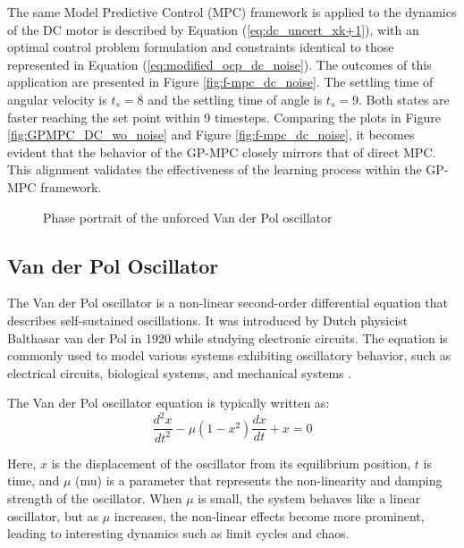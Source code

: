 The same Model Predictive Control (MPC) framework is applied to the dynamics of the DC motor is described by Equation (\ref{eq:dc_uncert_xk+1}), with an optimal control problem formulation and constraints identical to those represented in Equation (\ref{eq:modified_ocp_dc_noise}). The outcomes of this application are presented in Figure \ref{fig:f-mpc_dc_noise}. The settling time of angular velocity is $t_s=8$ and the settling time of angle is $t_s=9$. Both states are faster reaching the set point within 9 timesteps. Comparing the plots in Figure \ref{fig:GPMPC_DC_wo_noise} and Figure \ref{fig:f-mpc_dc_noise}, it becomes evident that the behavior of the GP-MPC closely mirrors that of direct MPC. This alignment validates the effectiveness of the learning process within the GP-MPC framework.

\begin{figure}
    \centering
    
    \caption{Phase portrait of the unforced Van der Pol oscillator}
    \label{fig:pp_vdp}
\end{figure}


\subsection{Van der Pol Oscillator}\label{sec:vdp_oscillator}
The Van der Pol oscillator is a non-linear second-order differential equation that describes self-sustained oscillations. It was introduced by Dutch physicist Balthasar van der Pol in 1920 while studying electronic circuits. The equation is commonly used to model various systems exhibiting oscillatory behavior, such as electrical circuits, biological systems, and mechanical systems \cite{guckenheimer1980}.



The Van der Pol oscillator equation is typically written as:
\begin{equation} \label{eq:vdp_deq}
    \frac{{d^2x}}{{dt^2}} - \mu (1 - x^2) \frac{{dx}}{{dt}} + x = 0
\end{equation}  

Here, \( x \) is the displacement of the oscillator from its equilibrium position, \( t \) is time, and \( \mu \) (mu) is a parameter that represents the non-linearity and damping strength of the oscillator. When \( \mu \) is small, the system behaves like a linear oscillator, but as \( \mu \) increases, the non-linear effects become more prominent, leading to interesting dynamics such as limit cycles and chaos.




